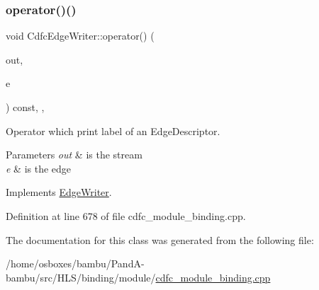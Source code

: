 \subsubsection{\texorpdfstring{operator()()}{operator()()}}
{\footnotesize\ttfamily void Cdfc\+Edge\+Writer\+::operator() (\begin{DoxyParamCaption}\item[{std\+::ostream \&}]{out,  }\item[{const \hyperlink{graph_8hpp_a9eb9afea34e09f484b21f2efd263dd48}{Edge\+Descriptor} \&}]{e }\end{DoxyParamCaption}) const\hspace{0.3cm}{\ttfamily [inline]}, {\ttfamily [override]}, {\ttfamily [virtual]}}



Operator which print label of an Edge\+Descriptor. 


\begin{DoxyParams}{Parameters}
{\em out} & is the stream \\
\hline
{\em e} & is the edge \\
\hline
\end{DoxyParams}


Implements \hyperlink{classEdgeWriter_a04dc5b68a11dcf253e21d29dfd1e06c3}{Edge\+Writer}.



Definition at line 678 of file cdfc\+\_\+module\+\_\+binding.\+cpp.



The documentation for this class was generated from the following file\+:\begin{DoxyCompactItemize}
\item 
/home/osboxes/bambu/\+Pand\+A-\/bambu/src/\+H\+L\+S/binding/module/\hyperlink{cdfc__module__binding_8cpp}{cdfc\+\_\+module\+\_\+binding.\+cpp}\end{DoxyCompactItemize}
